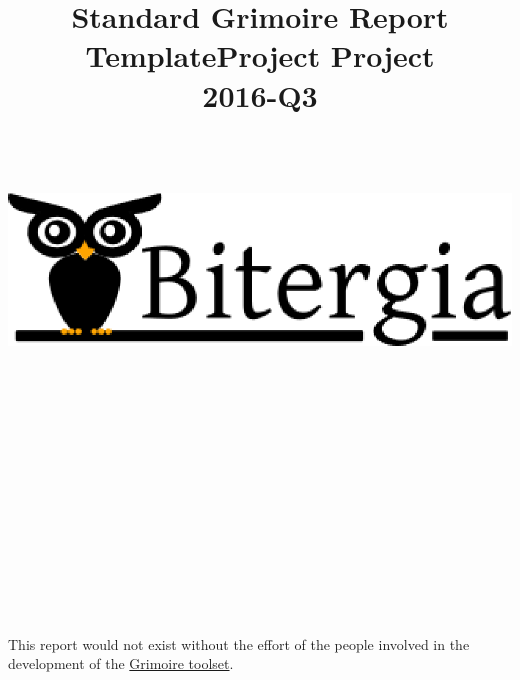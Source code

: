 \documentclass[a4wide,11pt]{report}
\begin{document}
\title{Standard Grimoire Report \\
  TemplateProject Project \\
      2016-Q3 \\
        ~~\\~~\\  \includegraphics[scale=.35]{logo}       \\}




\maketitle


\newpage
~~\\~\\~\\~\\


~~\\~~\\

~~\\
~~\\

\begin{tabular}{p{5cm}p{10cm}}

\end{tabular}

~~\\
~~\\

This report would not exist without the effort of the people involved in the development of the \href{http://grimoirelab.github.io}{Grimoire toolset}.

~~\\
~~\\
~~\\
~~\\
~~\\
~~\\
\end{document}
